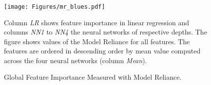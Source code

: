 \begin{figure}	
	\centering		
	\texttt{[image: Figures/mr\_blues.pdf]}
	\caption{Global Feature Importance Measured with Model Reliance.}
	\label{fig:mr_blues}
	\medskip
	\small
	Column \textit{LR} shows feature importance in linear regression and columns \textit{NN1} to \textit{NN4} the neural networks of respective depths. The figure shows values of the Model Reliance for all features. The features are ordered in descending order by mean value computed across the four neural networks (column \textit{Mean}).
\end{figure}
